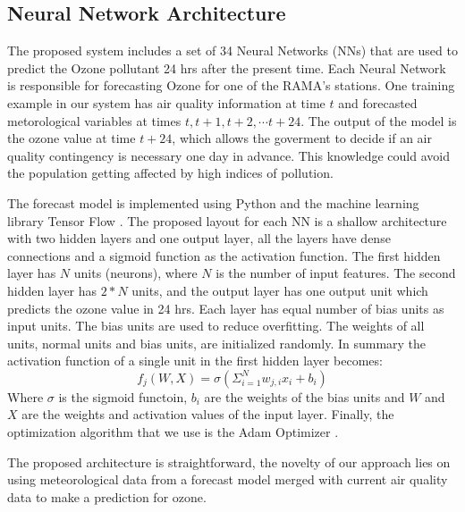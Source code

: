 \subsection{Neural Network Architecture}

The proposed system includes a set of 34 Neural Networks (NNs) that are used 
to predict the Ozone pollutant 24 hrs after the present time. 
Each Neural Network is responsible for forecasting Ozone for one of the RAMA's stations. 
One training example in our system has air quality information 
at time $t$ and forecasted metorological variables at times $t, t+1, t+2,\cdots t+24$. 
The output of the model is the ozone value at time $t+24$, which allows the
goverment to decide if an air quality contingency is necessary one day in advance.
This knowledge could avoid the population getting affected by high indices of pollution.

The forecast model is implemented using Python and the machine learning library Tensor Flow 
\cite{tensorflow2015-whitepaper}. The proposed layout for each NN
is a shallow architecture with two hidden layers and one output layer, all the layers have dense 
connections and a sigmoid function as the activation function. 
 The first hidden layer has $N$ units (neurons), where $N$ is the number of input features. The 
second hidden layer has $2*N$ units, and the output layer has one output unit which predicts the 
ozone value in 24 hrs. Each layer has equal number of bias units as input units. The
bias units are used to reduce overfitting.
The weights of all units, normal units and bias units, are initialized randomly.
In summary the activation function of a single unit in the first hidden layer becomes:
\begin{equation}
	f_j(W,X) = \sigma (\Sigma_{i=1}^N w_{j, i}x_i + b_i )
\end{equation}
Where $\sigma$ is the sigmoid functoin, $b_i$ are the weights of the bias units and
$W$ and $X$ are the weights and activation values of the input layer.  Finally, the 
optimization algorithm that we use is the Adam Optimizer \cite{adam}.  

The proposed architecture is straightforward, the novelty of our approach
lies on using meteorological data from a forecast model merged with current
air quality data to make a prediction for ozone. 
